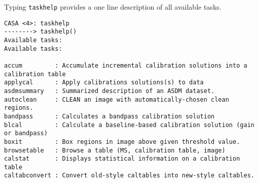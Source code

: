 Typing {\tt taskhelp} provides a one line description of all available
tasks.
\small
\begin{verbatim}
CASA <4>: taskhelp
--------> taskhelp()
Available tasks: 
Available tasks: 

accum         : Accumulate incremental calibration solutions into a calibration table
applycal      : Apply calibrations solutions(s) to data
asdmsummary   : Summarized description of an ASDM dataset.
autoclean     : CLEAN an image with automatically-chosen clean regions.
bandpass      : Calculates a bandpass calibration solution
blcal         : Calculate a baseline-based calibration solution (gain or bandpass)
boxit         : Box regions in image above given threshold value.
browsetable   : Browse a table (MS, calibration table, image)
calstat       : Displays statistical information on a calibration table
caltabconvert : Convert old-style caltables into new-style caltables.


\end{verbatim}
